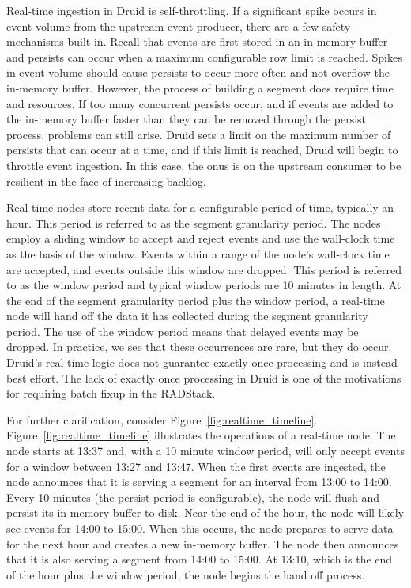 \documentclass{vldb}
\begin{document}
Real-time ingestion in Druid is self-throttling. If a significant spike occurs
in event volume from the upstream event producer, there are
a few safety mechanisms built in. Recall that events are first stored in an
in-memory buffer and persists can occur when a maximum configurable row limit
is reached. Spikes in event volume should cause persists to occur more often
and not overflow the in-memory buffer. However, the process of building a
segment does require time and resources. If too many concurrent persists occur,
and if events are added to the in-memory buffer faster than they can be removed
through the persist process, problems can still arise. Druid sets a limit on
the maximum number of persists that can occur at a time, and if this limit is
reached, Druid will begin to throttle event ingestion. In this case, the onus
is on the upstream consumer to be resilient in the face of increasing backlog.

Real-time nodes store recent data for a configurable period of time, typically
an hour. This period is referred to as the segment granularity period. The
nodes employ a sliding window to accept and reject events and use the
wall-clock time as the basis of the window. Events within a range of the node’s
wall-clock time are accepted, and events outside this window are dropped. This
period is referred to as the window period and typical window periods are 10
minutes in length. At the end of the segment granularity period plus the window
period, a real-time node will hand off the data it has collected during the
segment granularity period. The use of the window period means that delayed
events may be dropped. In practice, we see that these occurrences are rare, but
they do occur. Druid's real-time logic does not guarantee exactly once
processing and is instead best effort. The lack of exactly once processing in
Druid is one of the motivations for requiring batch fixup in the RADStack.

For further clarification, consider Figure~\ref{fig:realtime_timeline}.
Figure~\ref{fig:realtime_timeline} illustrates the operations of a real-time
node. The node starts at 13:37 and, with a 10 minute window period, will only
accept events for a window between 13:27 and 13:47.  When the first events are
ingested, the node announces that it is serving a segment for an
interval from 13:00 to 14:00. Every 10 minutes (the persist period is
configurable), the node will flush and persist its in-memory buffer to disk.
Near the end of the hour, the node will likely see events for 14:00 to 15:00.
When this occurs, the node prepares to serve data for the next hour and creates
a new in-memory buffer.  The node then announces that it is also serving a
segment from 14:00 to 15:00.  At 13:10, which is the end of the hour plus the
window period, the node begins the hand off process.
\end{document}

